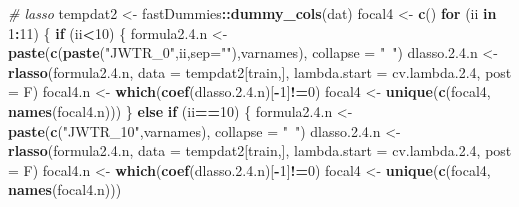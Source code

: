 \documentclass[
]{article}
\newenvironment{Shaded}{\begin{snugshade}}{\end{snugshade}}
\newcommand{\CommentTok}[1]{\textcolor[rgb]{0.56,0.35,0.01}{\textit{#1}}}
\newcommand{\ControlFlowTok}[1]{\textcolor[rgb]{0.13,0.29,0.53}{\textbf{#1}}}
\newcommand{\DataTypeTok}[1]{\textcolor[rgb]{0.13,0.29,0.53}{#1}}
\newcommand{\DecValTok}[1]{\textcolor[rgb]{0.00,0.00,0.81}{#1}}
\newcommand{\FloatTok}[1]{\textcolor[rgb]{0.00,0.00,0.81}{#1}}
\newcommand{\KeywordTok}[1]{\textcolor[rgb]{0.13,0.29,0.53}{\textbf{#1}}}
\newcommand{\NormalTok}[1]{#1}
\newcommand{\OperatorTok}[1]{\textcolor[rgb]{0.81,0.36,0.00}{\textbf{#1}}}
\newcommand{\StringTok}[1]{\textcolor[rgb]{0.31,0.60,0.02}{#1}}
\begin{document}
\begin{Shaded}
\begin{Highlighting}[]
\CommentTok{# lasso}
\NormalTok{tempdat2 <-}\StringTok{ }\NormalTok{fastDummies}\OperatorTok{::}\KeywordTok{dummy_cols}\NormalTok{(dat)}
\NormalTok{focal4 <-}\StringTok{ }\KeywordTok{c}\NormalTok{()}
\ControlFlowTok{for}\NormalTok{ (ii }\ControlFlowTok{in} \DecValTok{1}\OperatorTok{:}\DecValTok{11}\NormalTok{) \{}
  \ControlFlowTok{if}\NormalTok{ (ii}\OperatorTok{<}\DecValTok{10}\NormalTok{) \{}
\NormalTok{    formula2.}\FloatTok{4.}\NormalTok{n <-}\StringTok{ }\KeywordTok{paste}\NormalTok{(}\KeywordTok{c}\NormalTok{(}\KeywordTok{paste}\NormalTok{(}\StringTok{"JWTR_0"}\NormalTok{,ii,}\DataTypeTok{sep=}\StringTok{""}\NormalTok{),varnames), }\DataTypeTok{collapse =} \StringTok{"~"}\NormalTok{)}
\NormalTok{    dlasso.}\DecValTok{2}\NormalTok{.}\FloatTok{4.}\NormalTok{n <-}\StringTok{ }\KeywordTok{rlasso}\NormalTok{(formula2.}\FloatTok{4.}\NormalTok{n, }\DataTypeTok{data =}\NormalTok{ tempdat2[train,], }
                           \DataTypeTok{lambda.start =}\NormalTok{ cv.lambda.}\FloatTok{2.4}\NormalTok{, }\DataTypeTok{post =}\NormalTok{ F)}
\NormalTok{    focal4.n <-}\StringTok{ }\KeywordTok{which}\NormalTok{(}\KeywordTok{coef}\NormalTok{(dlasso.}\DecValTok{2}\NormalTok{.}\FloatTok{4.}\NormalTok{n)[}\OperatorTok{-}\DecValTok{1}\NormalTok{]}\OperatorTok{!=}\DecValTok{0}\NormalTok{)}
\NormalTok{    focal4 <-}\StringTok{ }\KeywordTok{unique}\NormalTok{(}\KeywordTok{c}\NormalTok{(focal4, }\KeywordTok{names}\NormalTok{(focal4.n)))}
\NormalTok{  \} }\ControlFlowTok{else} \ControlFlowTok{if}\NormalTok{ (ii}\OperatorTok{==}\DecValTok{10}\NormalTok{) \{}
\NormalTok{    formula2.}\FloatTok{4.}\NormalTok{n <-}\StringTok{ }\KeywordTok{paste}\NormalTok{(}\KeywordTok{c}\NormalTok{(}\StringTok{"JWTR_10"}\NormalTok{,varnames), }\DataTypeTok{collapse =} \StringTok{"~"}\NormalTok{)}
\NormalTok{    dlasso.}\DecValTok{2}\NormalTok{.}\FloatTok{4.}\NormalTok{n <-}\StringTok{ }\KeywordTok{rlasso}\NormalTok{(formula2.}\FloatTok{4.}\NormalTok{n, }\DataTypeTok{data =}\NormalTok{ tempdat2[train,], }
                           \DataTypeTok{lambda.start =}\NormalTok{ cv.lambda.}\FloatTok{2.4}\NormalTok{, }\DataTypeTok{post =}\NormalTok{ F)}
\NormalTok{    focal4.n <-}\StringTok{ }\KeywordTok{which}\NormalTok{(}\KeywordTok{coef}\NormalTok{(dlasso.}\DecValTok{2}\NormalTok{.}\FloatTok{4.}\NormalTok{n)[}\OperatorTok{-}\DecValTok{1}\NormalTok{]}\OperatorTok{!=}\DecValTok{0}\NormalTok{)}
\NormalTok{    focal4 <-}\StringTok{ }\KeywordTok{unique}\NormalTok{(}\KeywordTok{c}\NormalTok{(focal4, }\KeywordTok{names}\NormalTok{(focal4.n)))}

\end{Highlighting}
\end{Shaded}
\end{document}
